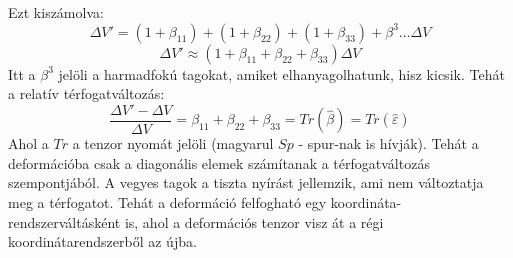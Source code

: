 \documentclass[../main.tex]{subfiles}
\begin{document}
Ezt kiszámolva:
\begin{equation}
    \Delta V' = (1 + \beta_{11}) + (1 + \beta_{22}) + (1 + \beta_{33}) + \beta^3 \dots  \Delta V
\end{equation}
\begin{equation}
    \Delta V' \approx \left(1 + \beta_{11} + \beta_{22} + \beta_{33}\right) \Delta V
\end{equation}
Itt a $\beta^3$ jelöli a harmadfokú tagokat, amiket elhanyagolhatunk, hisz kicsik. Tehát a relatív térfogatváltozás:
\begin{equation}
    \frac{\Delta V' - \Delta V}{\Delta V} = \beta_{11} + \beta_{22} + \beta_{33} = Tr(\hat{\beta}) = Tr(\hat{\varepsilon})
\end{equation}
Ahol a $Tr$ a tenzor nyomát jelöli (magyarul $Sp$ - spur-nak is hívják). Tehát a deformációba csak a diagonális elemek számítanak a térfogatváltozás szempontjából.
A vegyes tagok a tiszta nyírást jellemzik, ami nem változtatja meg a térfogatot. Tehát a deformáció felfogható egy koordináta-rendszerváltásként is, ahol a deformációs tenzor visz át a régi koordinátarendszerből az újba.
\end{document}
